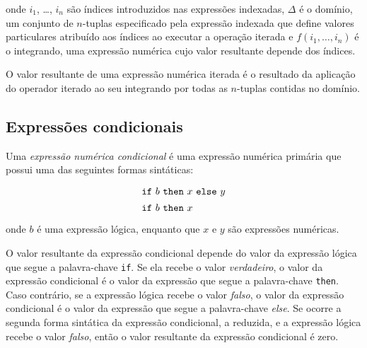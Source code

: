 \documentclass[11pt, brazil]{report}
\begin{document}
\noindent onde $i_1$, \dots, $i_n$ são índices introduzidos nas
expressões indexadas, $\Delta$ é o domínio, um conjunto de $n$-tuplas
especificado pela expressão indexada que define valores particulares
atribuído aos índices ao executar a operação iterada e
$f(i_1,\dots,i_n)$ é o integrando, uma expressão numérica cujo valor
resultante depende dos índices.

O valor resultante de uma expressão numérica iterada é o resultado da aplicação
do operador iterado ao seu integrando por todas as $n$-tuplas
contidas no domínio.

%

\subsection{Expressões condicionais}
\label{ifthen}

Uma {\it expressão numérica condicional} é uma expressão numérica primária
que possui uma das seguintes formas sintáticas:
$$
{\def\arraystretch{1.4}
\begin{array}{l}
\mbox{{\tt if} $b$ {\tt then} $x$ {\tt else} $y$}\\
\mbox{{\tt if} $b$ {\tt then} $x$}\\
\end{array}
}
$$
onde $b$ é uma expressão lógica, enquanto que $x$ e $y$ são expressões numéricas.



O valor resultante da expressão condicional depende do valor da
expressão lógica que segue a palavra-chave {\tt if}. Se ela recebe
o valor {\it verdadeiro}, o valor da expressão condicional é o valor
da expressão que segue a palavra-chave {\tt then}.
Caso contrário, se a expressão lógica recebe o valor {\it falso},
o valor da expressão condicional é o valor da expressão que segue
a palavra-chave {\it else}. Se ocorre a segunda forma sintática
da expressão condicional, a reduzida, e a expressão lógica recebe o valor
{\it falso}, então o valor resultante da expressão condicional é zero.
\end{document}
